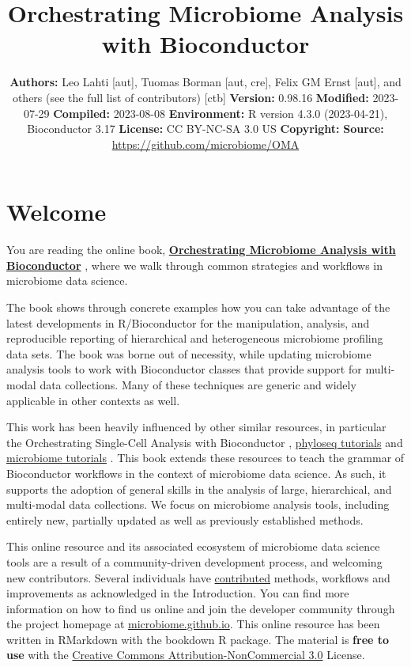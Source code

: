 \documentclass[
]{book}
\title{Orchestrating Microbiome Analysis with Bioconductor}
\author{}
\date{\vspace{-2.5em}\textbf{Authors:} Leo Lahti {[}aut{]}, Tuomas Borman {[}aut, cre{]}, Felix GM Ernst {[}aut{]}, and others (see the full list of contributors) {[}ctb{]} \textbf{Version:} 0.98.16 \textbf{Modified:} 2023-07-29 \textbf{Compiled:} 2023-08-08 \textbf{Environment:} R version 4.3.0 (2023-04-21), Bioconductor 3.17 \textbf{License:} CC BY-NC-SA 3.0 US \textbf{Copyright:} \textbf{Source:} \url{https://github.com/microbiome/OMA}}
\begin{document}
\maketitle

{
\setcounter{tocdepth}{1}
\tableofcontents
}
\hypertarget{welcome}{%
\chapter*{Welcome}\label{welcome}}

You are reading the online book, \href{https://microbiome.github.io/OMA/}{\textbf{Orchestrating Microbiome Analysis
with Bioconductor}} \citep{OMA}, where we
walk through common strategies and workflows in microbiome data
science.

The book shows through concrete examples how you can take advantage of
the latest developments in R/Bioconductor for the manipulation,
analysis, and reproducible reporting of hierarchical and heterogeneous
microbiome profiling data sets. The book was borne out of necessity,
while updating microbiome analysis tools to work with Bioconductor
classes that provide support for multi-modal data collections. Many of
these techniques are generic and widely applicable in other contexts
as well.

This work has been heavily influenced by other similar resources, in
particular the Orchestrating Single-Cell Analysis with Bioconductor
\citep{Amezquita2020}, \href{http://joey711.github.io/phyloseq/tutorials-index}{phyloseq
tutorials}
\citep{Callahan2016} and \href{https://microbiome.github.io/tutorials/}{microbiome
tutorials} \citep{Shetty2019}.
This book extends these resources to teach the grammar of Bioconductor
workflows in the context of microbiome data science. As such, it
supports the adoption of general skills in the analysis of large,
hierarchical, and multi-modal data collections. We focus on microbiome
analysis tools, including entirely new, partially updated as well as
previously established methods.

This online resource and its associated ecosystem of microbiome data
science tools are a result of a community-driven development process,
and welcoming new contributors. Several individuals have
\href{https://github.com/microbiome/OMA/graphs/contributors}{contributed}
methods, workflows and improvements as acknowledged in the
Introduction. You can find more information on how to find us online
and join the developer community through the project homepage at
\href{https://microbiome.github.io}{microbiome.github.io}. This online
resource has been written in RMarkdown with the bookdown R
package. The material is \textbf{free to use} with the \href{https://creativecommons.org/licenses/by-nc/3.0/us/}{Creative Commons
Attribution-NonCommercial
3.0} License.
\end{document}
